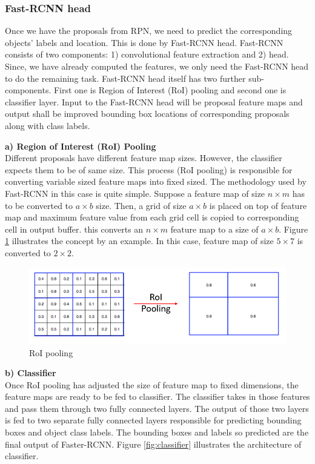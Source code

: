 \subsubsection{Fast-RCNN head}
Once we have the proposals from RPN, we need to predict the corresponding objects' labels and location. This is done by Fast-RCNN head. Fast-RCNN consists of two components: 1) convolutional feature extraction and  2) head. Since, we have already computed the features, we only need the Fast-RCNN head to do the remaining task. Fast-RCNN head itself has two further sub-components. First one is Region of Interest (RoI) pooling and second one is classifier layer. Input to the Fast-RCNN head will be proposal feature maps and output shall be improved bounding box locations of corresponding proposals along with class labels. 


\textbf{a) Region of Interest (RoI) Pooling} \\
Different proposals have different feature map sizes. However, the classifier expects them to be of same size. This process (RoI pooling) is responsible for converting variable sized feature maps into fixed sized. The methodology used by Fast-RCNN in this case is quite simple. Suppose a feature map of size $n\times m$ has to be converted to $a \times b$ size. Then, a grid of size $a \times b$ is placed on top of feature map and maximum feature value from each grid cell is copied to corresponding cell in output buffer. this converts an $n\times m$ feature map to a size of $a \times b$. Figure \ref{fig:roi-pooling} illustrates the concept by an example. In this case, feature map of size $5 \times 7$ is converted to $2 \times 2$.

\begin{figure}
    \centering
    \includegraphics[width=\linewidth]{images/roi-pooling.PNG}
    \caption{RoI pooling}
    \label{fig:roi-pooling}
\end{figure}

\textbf{b) Classifier} \\
Once RoI pooling has adjusted the size of feature map to fixed dimensions, the feature maps are ready to be fed to classifier. The classifier takes in those features and pass them through two fully connected layers. The output of those two layers is fed to two separate fully connected layers responsible for predicting bounding boxes and object class labels. The bounding boxes and labels so predicted are the final output of Faster-RCNN. Figure \ref{fig:classifier} illustrates the architecture of classifier.

